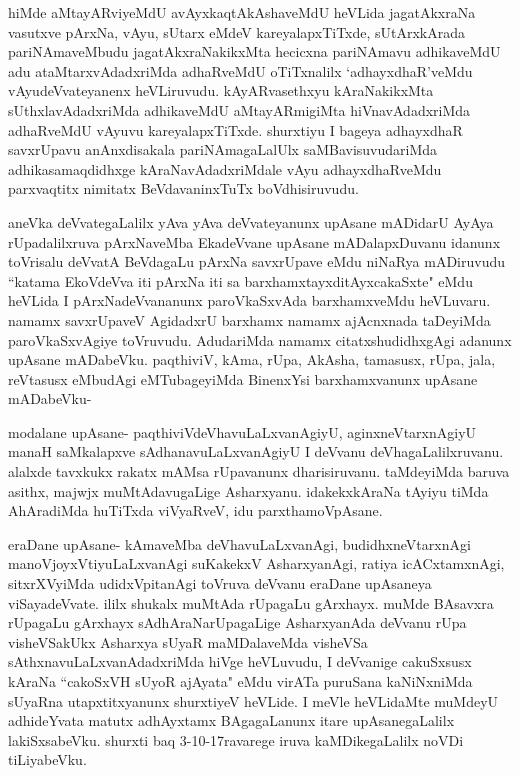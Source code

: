 \begin{artha}
hiMde aMtayARviyeMdU avAyxkaqtAkAshaveMdU heVLida jagatAkxraNa vasutxve pArxNa, vAyu, sUtarx eMdeV kareyalapxTiTxde, sUtArxkArada pariNAmaveMbudu jagatAkxraNakikxMta hecicxna pariNAmavu adhikaveMdU adu ataMtarxvAdadxriMda adhaRveMdU oTiTxnalilx `adhayxdhaR'veMdu vAyudeVvateyanenx heVLiruvudu. kAyARvasethxyu kAraNakikxMta sUthxlavAdadxriMda adhikaveMdU aMtayARmigiMta hiVnavAdadxriMda adhaRveMdU vAyuvu kareyalapxTiTxde. shurxtiyu I bageya adhayxdhaR savxrUpavu anAnxdisakala pariNAmagaLalUlx saMBavisuvudariMda adhikasamaqdidhxge kAraNavAdadxriMdale vAyu adhayxdhaRveMdu parxvaqtitx nimitatx BeVdavaninxTuTx boVdhisiruvudu. 
\end{artha}

\begin{artha}
aneVka deVvategaLalilx yAva yAva deVvateyanunx upAsane mADidarU AyAya rUpadalilxruva pArxNaveMba EkadeVvane upAsane mADalapxDuvanu idanunx toVrisalu deVvatA BeVdagaLu pArxNa savxrUpave eMdu niNaRya mADiruvudu ``katama EkoVdeVva iti pArxNa iti sa barxhamxtayxditAyxcakaSxte" eMdu heVLida I pArxNadeVvananunx paroVkaSxvAda barxhamxveMdu heVLuvaru. namamx savxrUpaveV AgidadxrU barxhamx namamx ajAcnxnada taDeyiMda paroVkaSxvAgiye toVruvudu. AdudariMda namamx citatxshudidhxgAgi adanunx upAsane mADabeVku. paqthiviV, kAma, rUpa, AkAsha, tamasusx, rUpa, jala, reVtasusx eMbudAgi eMTubageyiMda BinenxYsi barxhamxvanunx upAsane mADabeVku-
\end{artha}

\begin{artha}
modalane upAsane- paqthiviVdeVhavuLaLxvanAgiyU, aginxneVtarxnAgiyU manaH saMkalapxve sAdhanavuLaLxvanAgiyU I deVvanu deVhagaLalilxruvanu. alalxde tavxkukx rakatx mAMsa rUpavanunx dharisiruvanu. taMdeyiMda baruva asithx, majwjx muMtAdavugaLige Asharxyanu. idakekxkAraNa tAyiyu tiMda AhAradiMda huTiTxda viVyaRveV, idu parxthamoVpAsane. 
\end{artha}

\begin{artha}
eraDane upAsane- kAmaveMba deVhavuLaLxvanAgi, budidhxneVtarxnAgi manoVjoyxVtiyuLaLxvanAgi suKakekxV AsharxyanAgi, ratiya icACxtamxnAgi, sitxrXVyiMda udidxVpitanAgi toVruva deVvanu eraDane upAsaneya viSayadeVvate. ililx shukalx muMtAda rUpagaLu gArxhayx. muMde BAsavxra rUpagaLu gArxhayx sAdhAraNarUpagaLige AsharxyanAda deVvanu rUpa visheVSakUkx Asharxya sUyaR maMDalaveMda visheVSa sAthxnavuLaLxvanAdadxriMda hiVge heVLuvudu, I deVvanige cakuSxsusx kAraNa ``cakoSxVH sUyoR ajAyata" eMdu virATa puruSana kaNiNxniMda sUyaRna utapxtitxyanunx shurxtiyeV heVLide. I meVle heVLidaMte muMdeyU adhideYvata matutx adhAyxtamx BAgagaLanunx itare upAsanegaLalilx lakiSxsabeVku. shurxti baq 3-10-17ravarege iruva kaMDikegaLalilx noVDi tiLiyabeVku.
\end{artha}

